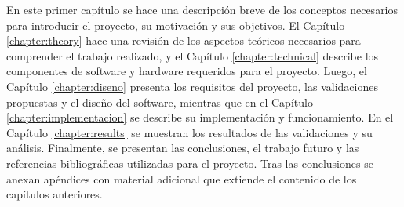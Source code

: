 En este primer capítulo se hace una descripción breve de los conceptos necesarios para introducir el proyecto, su motivación y sus objetivos. El Capítulo \ref{chapter:theory} hace una revisión de los aspectos teóricos necesarios para comprender el trabajo realizado, y el Capítulo \ref{chapter:technical} describe los componentes de software y hardware requeridos para el proyecto. Luego, el Capítulo \ref{chapter:diseno} presenta los requisitos del proyecto, las validaciones propuestas y el diseño del software, mientras que en el Capítulo \ref{chapter:implementacion} se describe su implementación y funcionamiento. En el Capítulo \ref{chapter:results} se muestran los resultados de las validaciones y su análisis. Finalmente, se presentan las conclusiones, el trabajo futuro y las referencias bibliográficas utilizadas para el proyecto. Tras las conclusiones se anexan apéndices con material adicional que extiende el contenido de los capítulos anteriores.

